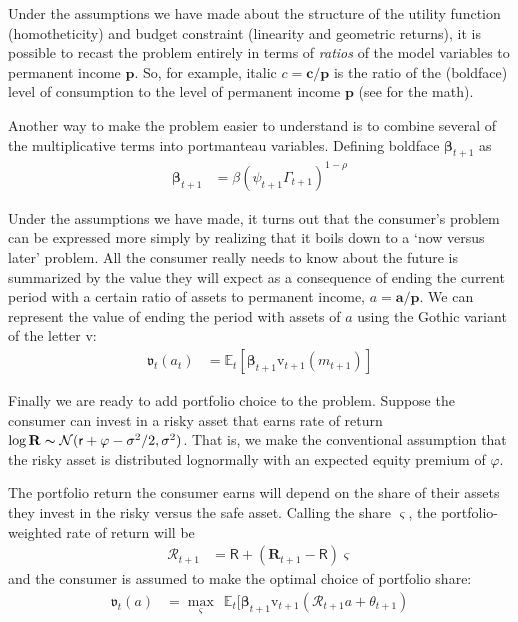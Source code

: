 \documentclass{article}
\newcommand{\CRRA}{\rho}
\newcommand{\pLvl}{\mathbf{p}}
\newcommand{\DiscFac}{\beta}
\newcommand{\vFunc}{\mathrm{v}}
\newcommand{\Alive}{\mathcal{L}}
\newcommand{\cLvl}{\mathbf{c}}
\newcommand{\Ex}{\mathbb{E}}
\newcommand{\permGroFac}{\Gamma}
\newcommand{\permShk}{\psi}
\newcommand{\cNrm}{c}
\newcommand{\Rfree}{\mathsf{R}}
\newcommand{\RNrm}{\mathcal{R}}
\newcommand{\aLvl}{\mathbf{a}}
\newcommand{\aNrm}{a}
\newcommand{\mNrm}{m}
\newcommand{\rfree}{\mathsf{r}}
\newcommand{\eprem}{\varphi}
\newcommand{\Risky}{\mathbf{R}}
\newcommand{\Rport}{\mathcal{R}}
\begin{document}
Under the assumptions we have made about the structure of the utility function (homotheticity) and budget constraint (linearity and geometric returns), it is possible to recast the problem entirely in terms of \textit{ratios} of the model variables to permanent income $\pLvl$. So, for example, italic $\cNrm = \cLvl/\pLvl$ is the ratio of the (boldface) level of consumption to the level of permanent income $\pLvl$ (see \cite{BufferStockTheory} for the math).

Another way to make the problem easier to understand is to combine several of the multiplicative terms into portmanteau variables. Defining boldface $\pmb{\DiscFac}_{t+1}$ as
\begin{align}
     \pmb{\DiscFac}_{t+1} & ={\beta} (\permShk_{t+1} \permGroFac_{t+1})^{1-\CRRA}
\end{align}


Under the assumptions we have made, it turns out that the consumer's problem can be expressed more simply by realizing that it boils down to a `now versus later' problem.  All the consumer really needs to know about the future is summarized by the value they will expect as a consequence of ending the current period with a certain ratio of assets to permanent income, $\aNrm = \aLvl/\pLvl$. We can represent the value of ending the period with assets of $\aNrm$ using the Gothic variant of the letter $\vFunc$:
\begin{align}
    \mathfrak{v}_{t}(\aNrm_{t}) & = \Ex_{t}[\pmb{\DiscFac}_{t+1}\vFunc_{t+1}(\mNrm_{t+1})]
\end{align}

Finally we are ready to add portfolio choice to the problem. Suppose the consumer can invest in a risky asset that earns rate of return $\log \Risky \thicksim \mathcal{N}(\rfree + \eprem - \sigma^{2}/2, \sigma^{2})$. That is, we make the conventional assumption that the risky asset is distributed lognormally with an expected equity premium of $\eprem$.

The portfolio return the consumer earns will depend on the share of their assets they invest in the risky versus the safe asset. Calling the share $\varsigma$, the portfolio-weighted rate of return will be
\begin{align}
    \Rport_{t+1} & = \Rfree + (\Risky_{t+1}-\Rfree)\varsigma
\end{align}
and the consumer is assumed to make the optimal choice of portfolio share:
\begin{align}
\mathfrak{v}_{t}(a) & = \max_{\varsigma}~~ \Ex_{t}[\pmb{\beta}_{t+1} \vFunc_{t+1}(\Rport_{t+1} a + \theta_{t+1})
\end{align}
\end{document}
